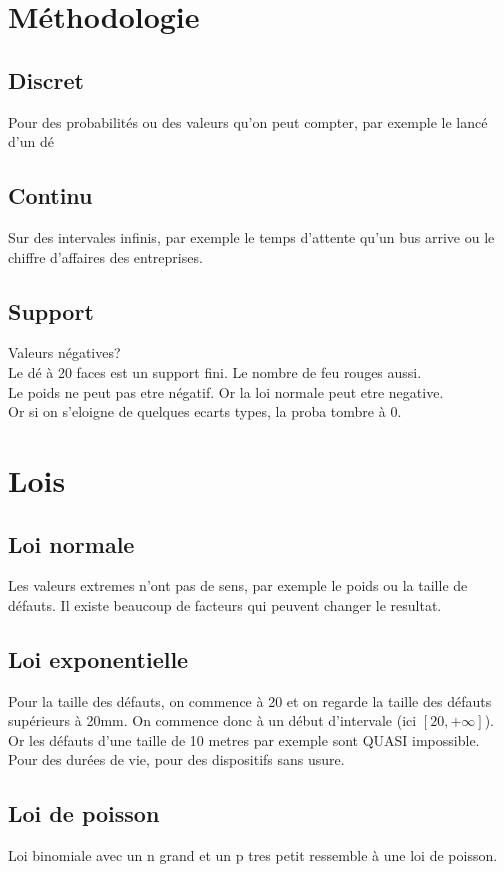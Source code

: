 \documentclass[11pt]{article}
\begin{document}
\section{Méthodologie}
\subsection{Discret}
Pour des probabilités ou des valeurs qu'on peut compter, par exemple le lancé d'un dé
\subsection{Continu}
Sur des intervales infinis, par exemple le temps d'attente qu'un bus arrive ou le chiffre d'affaires des entreprises.

\subsection{Support}
Valeurs négatives?\\
Le dé à 20 faces est un support fini. Le nombre de feu rouges aussi.\\
Le poids ne peut pas etre négatif. Or la loi normale peut etre negative.\\
Or si on s'eloigne de quelques ecarts types, la proba tombre à 0.

\pagebreak

\section{Lois}
\subsection{Loi normale}
Les valeurs extremes n'ont pas de sens, par exemple le poids ou la taille de défauts.
Il existe beaucoup de facteurs qui peuvent changer le resultat.

\subsection{Loi exponentielle}
Pour la taille des défauts, on commence à 20 et on regarde la taille des défauts supérieurs à 20mm.
On commence donc à un début d'intervale (ici $[20,+\infty]$). Or les défauts d'une taille de 10 metres par exemple sont QUASI impossible.
Pour des durées de vie, pour des dispositifs sans usure.

\subsection{Loi de poisson}
Loi binomiale avec un n grand et un p tres petit ressemble à une loi de poisson.
\end{document}
